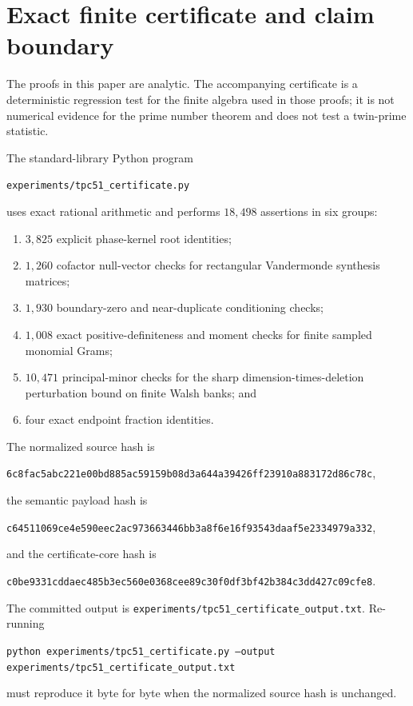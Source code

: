 \section{Exact finite certificate and claim boundary}
\label{sec:tpc51-certificate}

The proofs in this paper are analytic.  The accompanying certificate is
a deterministic regression test for the finite algebra used in those
proofs; it is not numerical evidence for the prime number theorem and
does not test a twin-prime statistic.

The standard-library Python program
\begin{center}
\texttt{experiments/tpc51\_certificate.py}
\end{center}
uses exact rational arithmetic and performs \(18{,}498\) assertions in
six groups:
\begin{enumerate}[label=\textup{(C\arabic*)},leftmargin=3.2em]
 \item \(3{,}825\) explicit phase-kernel root identities;
 \item \(1{,}260\) cofactor null-vector checks for rectangular
       Vandermonde synthesis matrices;
 \item \(1{,}930\) boundary-zero and near-duplicate conditioning checks;
 \item \(1{,}008\) exact positive-definiteness and moment checks for
       finite sampled monomial Grams;
 \item \(10{,}471\) principal-minor checks for the sharp
       dimension-times-deletion perturbation bound on finite Walsh
       banks; and
 \item four exact endpoint fraction identities.
\end{enumerate}
The normalized source hash is
\begin{center}
{\small\texttt{6c8fac5abc221e00bd885ac59159b08d3a644a39426ff23910a883172d86c78c}},
\end{center}
the semantic payload hash is
\begin{center}
{\small\texttt{c64511069ce4e590eec2ac973663446bb3a8f6e16f93543daaf5e2334979a332}},
\end{center}
and the certificate-core hash is
\begin{center}
{\small\texttt{c0be9331cddaec485b3ec560e0368cee89c30f0df3bf42b384c3dd427c09cfe8}}.
\end{center}
The committed output is
\texttt{experiments/tpc51\_certificate\_output.txt}.  Re-running
\begin{center}
\texttt{python experiments/tpc51\_certificate.py
        --output experiments/tpc51\_certificate\_output.txt}
\end{center}
must reproduce it byte for byte when the normalized source hash is
unchanged.

